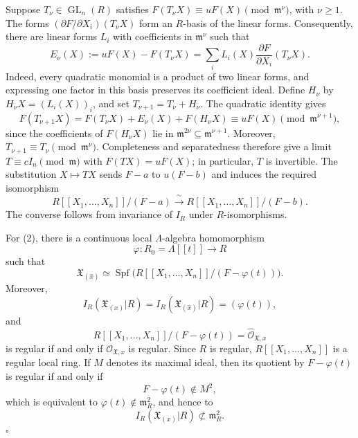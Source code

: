 Suppose $T_\nu\in\operatorname{GL}_n(R)$ satisfies
$F(T_\nu X)\equiv uF(X)\pmod{\mathfrak m^\nu}$, with $\nu\geq1$.
The forms $(\partial F/\partial X_i)(T_\nu X)$ form an $R$-basis of
the linear forms. Consequently, there are linear forms $L_i$ with
coefficients in $\mathfrak m^\nu$ such that
\[
E_\nu(X):=uF(X)-F(T_\nu X)
 =\sum_i L_i(X)\frac{\partial F}{\partial X_i}(T_\nu X).
\]
Indeed, every quadratic monomial is a product of two linear forms,
and expressing one factor in this basis preserves its coefficient ideal.
Define $H_\nu$ by $H_\nu X=(L_i(X))_i$, and set
$T_{\nu+1}=T_\nu+H_\nu$. The quadratic identity gives
\[
F(T_{\nu+1}X)=F(T_\nu X)+E_\nu(X)+F(H_\nu X)
 \equiv uF(X)\pmod{\mathfrak m^{\nu+1}},
\]
since the coefficients of $F(H_\nu X)$ lie in
$\mathfrak m^{2\nu}\subseteq\mathfrak m^{\nu+1}$.
Moreover, $T_{\nu+1}\equiv T_\nu\pmod{\mathfrak m^\nu}$.
Completeness and separatedness therefore give a limit
$T\equiv cI_n\pmod{\mathfrak m}$ with $F(TX)=uF(X)$; in particular,
$T$ is invertible. The substitution $X\mapsto TX$ sends
$F-a$ to $u(F-b)$ and induces the required isomorphism
\[
R[[X_1,\ldots,X_n]]/(F-a)
 \xrightarrow{\ \sim\ }
R[[X_1,\ldots,X_n]]/(F-b).
\]
The converse follows from invariance of $I_R$ under $R$-isomorphisms.

For (2), there is a continuous local $\Lambda$-algebra homomorphism
\[
\varphi:R_0=\Lambda[[t]]\longrightarrow R
\]
such that
\[
\mathfrak X_{(\widehat x)}
\simeq\operatorname{Spf}
 \bigl(R[[X_1,\ldots,X_n]]/(F-\varphi(t))\bigr).
\]
Moreover,
\[
I_R(\mathfrak X_{(x)}|R)
=I_R(\mathfrak X_{(\widehat x)}|R)
=(\varphi(t)),
\]
and
\[
R[[X_1,\ldots,X_n]]/(F-\varphi(t))
=\widehat{\mathcal O}_{\mathfrak X,x}
\]
is regular if and only if $\mathcal O_{\mathfrak X,x}$ is regular.
Since $R$ is regular,
$R[[X_1,\ldots,X_n]]$ is a regular local ring. If $M$ denotes its
maximal ideal, then its quotient by $F-\varphi(t)$ is regular if and
only if
\[
F-\varphi(t)\notin M^2,
\]
which is equivalent to
$\varphi(t)\notin\mathfrak m_R^2$, and hence to
\[
I_R(\mathfrak X_{(x)}|R)\not\subset\mathfrak m_R^2.
\]
\hfill$\square$
